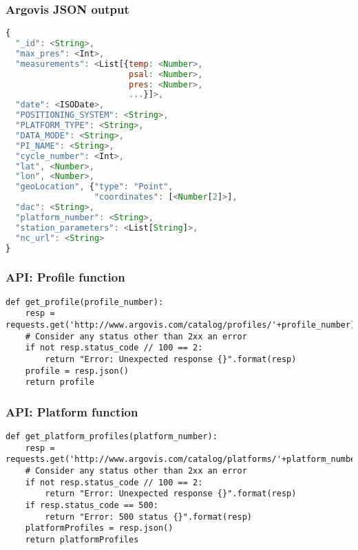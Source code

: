 





\begin{frame}[fragile]
\frametitle{Argovis JSON output}
\begin{lstlisting}[language=JavaScript, basicstyle=\tiny, caption=JSON schema of mongoDB profile.]
{
  "_id": <String>,
  "max_pres": <Int>,
  "measurements": <List[{temp: <Number>,
                         psal: <Number>,
                         pres: <Number>,
                         ...}]>,
  "date": <ISODate>,
  "POSITIONING_SYSTEM": <String>,
  "PLATFORM_TYPE": <String>,
  "DATA_MODE": <String>,
  "PI_NAME": <String>,
  "cycle_number": <Int>,
  "lat", <Number>,
  "lon", <Number>,
  "geoLocation", {"type": "Point",
                  "coordinates": [<Number[2]>],
  "dac": <String>,
  "platform_number": <String>,
  "station_parameters": <List[String]>, 
  "nc_url": <String>
}
\end{lstlisting}
\end{frame}

\begin{frame}[fragile]
\frametitle{API: Profile function}
\begin{lstlisting}[basicstyle=\tiny, caption=Python function to retrieve profile data. Uses 'requests' library]
def get_profile(profile_number):
    resp = requests.get('http://www.argovis.com/catalog/profiles/'+profile_number)
    # Consider any status other than 2xx an error
    if not resp.status_code // 100 == 2:
        return "Error: Unexpected response {}".format(resp)
    profile = resp.json()
    return profile
\end{lstlisting}
\end{frame}

\begin{frame}[fragile]
\frametitle{API: Platform function}
\begin{lstlisting}[basicstyle=\tiny, caption=Python function to retrieve platform data]
def get_platform_profiles(platform_number):
    resp = requests.get('http://www.argovis.com/catalog/platforms/'+platform_number)
    # Consider any status other than 2xx an error
    if not resp.status_code // 100 == 2:
        return "Error: Unexpected response {}".format(resp)
    if resp.status_code == 500:
        return "Error: 500 status {}".format(resp)
    platformProfiles = resp.json()
    return platformProfiles
\end{lstlisting}
\end{frame}

